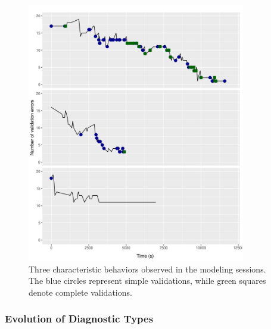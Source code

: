\begin{figure}
  \centering
\includegraphics[width=0.85\textwidth]{figures/results/profiles.png}
\caption{Three characteristic behaviors observed in the modeling sessions. The blue circles represent simple validations, while green squares denote complete validations.}
\label{fig:profiles}
\end{figure}

\subsubsection{Evolution of Diagnostic Types}


